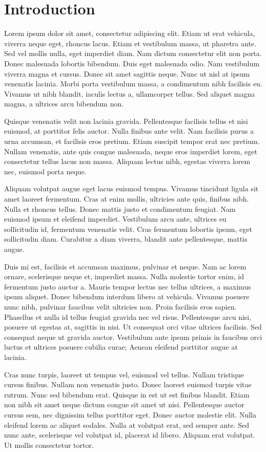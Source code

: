 \chapter{Introduction}
\label{ch:into}
Lorem ipsum dolor sit amet, consectetur adipiscing elit. Etiam ut erat vehicula, viverra neque eget, rhoncus lacus. Etiam et vestibulum massa, ut pharetra ante. Sed vel mollis nulla, eget imperdiet diam. Nam dictum consectetur elit non porta. Donec malesuada lobortis bibendum. Duis eget malesuada odio. Nam vestibulum viverra magna et cursus. Donec sit amet sagittis neque. Nunc ut nisl at ipsum venenatis lacinia. Morbi porta vestibulum massa, a condimentum nibh facilisis eu. Vivamus ut nibh blandit, iaculis lectus a, ullamcorper tellus. Sed aliquet magna magna, a ultrices arcu bibendum non.

Quisque venenatis velit non lacinia gravida. Pellentesque facilisis tellus et nisi euismod, at porttitor felis auctor. Nulla finibus ante velit. Nam facilisis purus a urna accumsan, et facilisis eros pretium. Etiam suscipit tempor erat nec pretium. Nullam venenatis, ante quis congue malesuada, neque eros imperdiet lorem, eget consectetur tellus lacus non massa. Aliquam lectus nibh, egestas viverra lorem nec, euismod porta neque.

Aliquam volutpat augue eget lacus euismod tempus. Vivamus tincidunt ligula sit amet laoreet fermentum. Cras at enim mollis, ultricies ante quis, finibus nibh. Nulla et rhoncus tellus. Donec mattis justo et condimentum feugiat. Nam euismod ipsum et eleifend imperdiet. Vestibulum arcu ante, ultrices eu sollicitudin id, fermentum venenatis velit. Cras fermentum lobortis ipsum, eget sollicitudin diam. Curabitur a diam viverra, blandit ante pellentesque, mattis augue.

Duis mi est, facilisis et accumsan maximus, pulvinar et neque. Nam ac lorem ornare, scelerisque neque et, imperdiet massa. Nulla molestie tortor enim, id fermentum justo auctor a. Mauris tempor lectus nec tellus ultrices, a maximus ipsum aliquet. Donec bibendum interdum libero at vehicula. Vivamus posuere nunc nibh, pulvinar faucibus velit ultricies non. Proin facilisis eros sapien. Phasellus et nulla id tellus feugiat gravida nec vel risus. Pellentesque arcu nisi, posuere ut egestas at, sagittis in nisi. Ut consequat orci vitae ultrices facilisis. Sed consequat neque ut gravida auctor. Vestibulum ante ipsum primis in faucibus orci luctus et ultrices posuere cubilia curae; Aenean eleifend porttitor augue at lacinia.

Cras nunc turpis, laoreet ut tempus vel, euismod vel tellus. Nullam tristique cursus finibus. Nullam non venenatis justo. Donec laoreet euismod turpis vitae rutrum. Nunc sed bibendum erat. Quisque in est ut est finibus blandit. Etiam non nibh sit amet neque dictum congue sit amet ut nisi. Pellentesque auctor cursus sem, nec dignissim tellus porttitor eget. Donec auctor molestie elit. Nulla eleifend lorem ac aliquet sodales. Nulla at volutpat erat, sed semper ante. Sed nunc ante, scelerisque vel volutpat id, placerat id libero. Aliquam erat volutpat. Ut mollis consectetur tortor.


